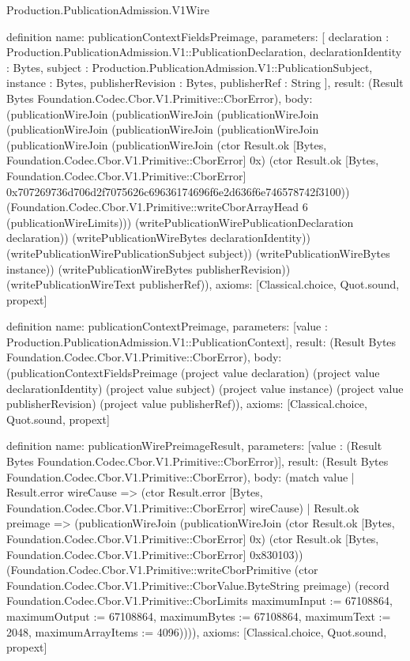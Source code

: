 \begin{lexlean}{Production.PublicationAdmission.V1Wire}
\begin{semanticmodule}
definition{
  name: publicationContextFieldsPreimage,
  parameters: [
    declaration : Production.PublicationAdmission.V1::PublicationDeclaration,
    declarationIdentity : Bytes,
    subject : Production.PublicationAdmission.V1::PublicationSubject,
    instance : Bytes,
    publisherRevision : Bytes,
    publisherRef : String
  ],
  result: (Result Bytes Foundation.Codec.Cbor.V1.Primitive::CborError),
  body: (publicationWireJoin (publicationWireJoin (publicationWireJoin (publicationWireJoin (publicationWireJoin (publicationWireJoin (publicationWireJoin (publicationWireJoin (ctor Result.ok [Bytes, Foundation.Codec.Cbor.V1.Primitive::CborError] 0x) (ctor Result.ok [Bytes, Foundation.Codec.Cbor.V1.Primitive::CborError] 0x707269736d706d2f7075626c69636174696f6e2d636f6e746578742f3100)) (Foundation.Codec.Cbor.V1.Primitive::writeCborArrayHead 6 (publicationWireLimits))) (writePublicationWirePublicationDeclaration declaration)) (writePublicationWireBytes declarationIdentity)) (writePublicationWirePublicationSubject subject)) (writePublicationWireBytes instance)) (writePublicationWireBytes publisherRevision)) (writePublicationWireText publisherRef)),
  axioms: [Classical.choice, Quot.sound, propext]
}

definition{
  name: publicationContextPreimage,
  parameters: [value : Production.PublicationAdmission.V1::PublicationContext],
  result: (Result Bytes Foundation.Codec.Cbor.V1.Primitive::CborError),
  body: (publicationContextFieldsPreimage (project value declaration) (project value declarationIdentity) (project value subject) (project value instance) (project value publisherRevision) (project value publisherRef)),
  axioms: [Classical.choice, Quot.sound, propext]
}

definition{
  name: publicationWirePreimageResult,
  parameters: [value : (Result Bytes Foundation.Codec.Cbor.V1.Primitive::CborError)],
  result: (Result Bytes Foundation.Codec.Cbor.V1.Primitive::CborError),
  body: (match value
    | Result.error wireCause => (ctor Result.error [Bytes, Foundation.Codec.Cbor.V1.Primitive::CborError] wireCause)
    | Result.ok preimage => (publicationWireJoin (publicationWireJoin (ctor Result.ok [Bytes, Foundation.Codec.Cbor.V1.Primitive::CborError] 0x) (ctor Result.ok [Bytes, Foundation.Codec.Cbor.V1.Primitive::CborError] 0x830103)) (Foundation.Codec.Cbor.V1.Primitive::writeCborPrimitive (ctor Foundation.Codec.Cbor.V1.Primitive::CborValue.ByteString preimage) (record Foundation.Codec.Cbor.V1.Primitive::CborLimits {maximumInput := 67108864, maximumOutput := 67108864, maximumBytes := 67108864, maximumText := 2048, maximumArrayItems := 4096})))),
  axioms: [Classical.choice, Quot.sound, propext]
}


\end{semanticmodule}
\end{lexlean}
